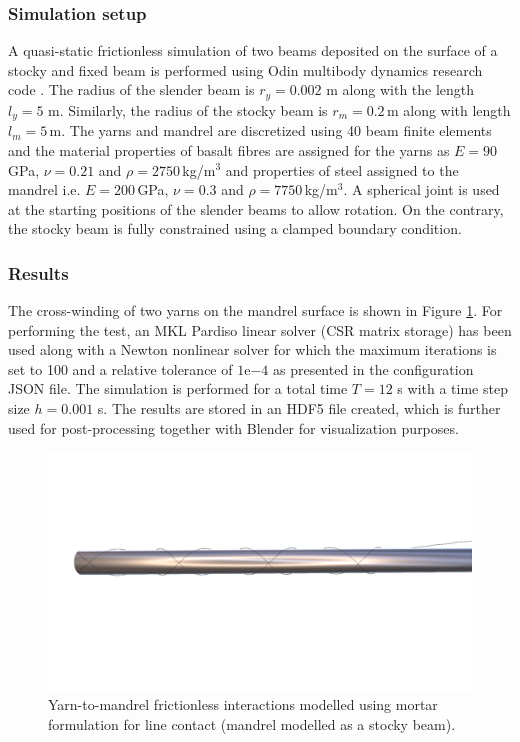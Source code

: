 \subsubsection{Simulation setup}
A quasi-static frictionless simulation of two beams deposited on the surface of a stocky and fixed beam is performed using Odin multibody dynamics research code \cite{odin2022}. The radius of the slender beam is $r_y = 0.002$ m along with the length $l_y = 5$ m. Similarly, the radius of the stocky beam is $r_m = 0.2\,$m along with length $l_m = 5\,$m. The yarns and mandrel are discretized using 40 beam finite elements and the material properties of basalt fibres are assigned for the yarns as $E = 90\,$GPa, $\nu = 0.21$ and $\rho = 2750\,$kg/m$^3$ and properties of steel assigned to the mandrel i.e. $E = 200\,$GPa, $\nu = 0.3$ and $\rho = 7750\,$kg/m$^3$. A spherical joint is used at the starting positions of the slender beams to allow rotation. On the contrary, the stocky beam is fully constrained using a clamped boundary condition.

\subsubsection{Results}
The cross-winding of two yarns on the mandrel surface is shown in Figure \ref{testsetup}. For performing the test, an MKL Pardiso linear solver (CSR matrix storage) has been used along with a Newton nonlinear solver for which the maximum iterations is set to 100 and a relative tolerance of $1\mathrm{e}{-4}$ as presented in the configuration JSON file. The simulation is performed for a total time $T = 12$ s with a time step size $h = 0.001$ s. The results are stored in an HDF5 file created, which is further used for post-processing together with Blender for visualization purposes.

\begin{figure}[h]
    \centering
    \includegraphics[width=400pt]{figures/mortaryarnmandrel_1.png}
    \caption{Yarn-to-mandrel frictionless interactions modelled using mortar formulation for line contact (mandrel modelled as a stocky beam).}
    \label{testsetup}
\end{figure}


















